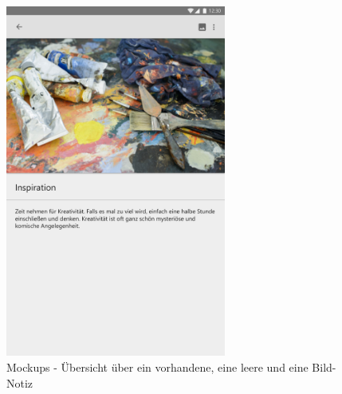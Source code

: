 \begin{figure}[H]
	\includegraphics[width=7.25cm]{img/NoteActivityImage.pdf}
	\caption{Mockups - Übersicht über ein vorhandene, eine leere und eine Bild-Notiz}
	\label{img:NoteActivity}
\end{figure}

